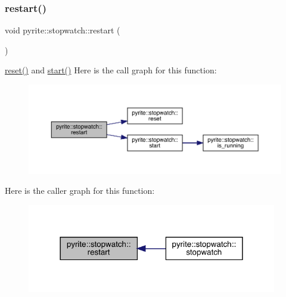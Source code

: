 \subsubsection{\texorpdfstring{restart()}{restart()}}
{\footnotesize\ttfamily void pyrite\+::stopwatch\+::restart (\begin{DoxyParamCaption}{ }\end{DoxyParamCaption})\hspace{0.3cm}{\ttfamily [inline]}}

\mbox{\hyperlink{classpyrite_1_1stopwatch_ac6dd6a9c17ec2f2afc6b99cf1be86e04}{reset()}} and \mbox{\hyperlink{classpyrite_1_1stopwatch_ae1f6baec67daf518cf4d6bfbaab43cb1}{start()}} Here is the call graph for this function\+:
\nopagebreak
\begin{figure}[H]
\begin{center}
\leavevmode
\includegraphics[width=350pt]{d6/dd1/classpyrite_1_1stopwatch_a3fc39be2c2271eb57b9d8d30f5632dea_cgraph}
\end{center}
\end{figure}
Here is the caller graph for this function\+:
\nopagebreak
\begin{figure}[H]
\begin{center}
\leavevmode
\includegraphics[width=309pt]{d6/dd1/classpyrite_1_1stopwatch_a3fc39be2c2271eb57b9d8d30f5632dea_icgraph}
\end{center}
\end{figure}
\mbox{\label{classpyrite_1_1stopwatch_ae1f6baec67daf518cf4d6bfbaab43cb1}} 
